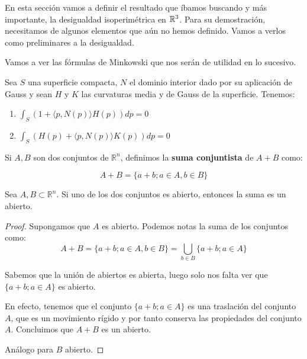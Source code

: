 En esta sección vamos a definir el resultado que íbamos buscando y  más importante, la desigualdad isoperimétrica en $\mathbb{R}^3$. Para su demostración, necesitamos de algunos elementos que aún no hemos definido. Vamos a verlos como preliminares a la desigualdad.

Vamos a ver las fórmulas de Minkowski que nos serán de utilidad en lo sucesivo.
\begin{theorem}
Sea $S$ una superficie compacta, $N$ el dominio interior dado por su aplicación de Gauss y sean $H$ y $K$ las curvaturas media y de Gauss de la superficie. Tenemos:

\begin{enumerate}
    \item $\int_S (1 + \langle p, N(p) \rangle H(p))dp = 0$
    \item $\int_S (H(p)+ \langle p, N(p) \rangle K(p))dp = 0$
\end{enumerate}
\end{theorem}

\begin{definition}
Si $A, B$ son dos conjuntos de $\mathbb{R}^n$, definimos la \textbf{suma conjuntista} de $A+B$ como:

\begin{equation*}
    A+B = \{a+b; a \in A, b \in B\}
\end{equation*}
\end{definition}

\begin{lemma}
Sea $A,B \subset \mathbb{R}^n$. Si uno de los dos conjuntos es abierto, entonces la suma es un abierto.
\end{lemma}
\begin{proof}
Supongamos que $A$ es abierto.
Podemos notas la suma de los conjuntos como:
\begin{equation*}
    A + B = \{a+b; a \in A, b \in B\} = \bigcup_{b \in B} \{a+b; a \in A\}
\end{equation*}

Sabemos que la unión de abiertos es abierta, luego solo nos falta ver que $\{a+b; a \in A\}$ es abierto.

En efecto, tenemos que el conjunto $\{a+b; a \in A\}$ es una traslación del conjunto $A$, que es un movimiento rígido y por tanto conserva las propiedades del conjunto $A$. Concluimos que $A+B$ es un abierto.

Análogo para $B$ abierto.
\end{proof}


